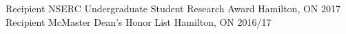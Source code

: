 \begin{cvhonors}
     \cvhonor
       {Recipient}
       {NSERC Undergraduate Student Research Award}
       {Hamilton, ON} %
       {2017}
     \cvhonor
      {Recipient}
      {McMaster Dean's Honor List}
      {Hamilton, ON}
      {2016/17}
\end{cvhonors}

